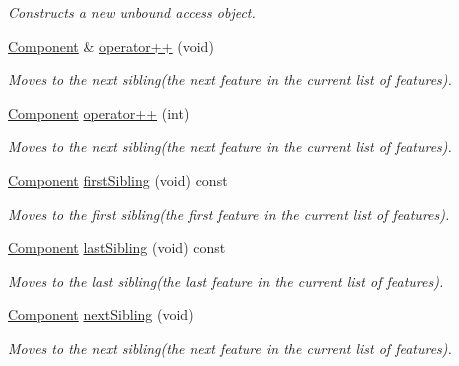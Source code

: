 \begin{DoxyCompactItemize}
\begin{DoxyCompactList}\small\item\em Constructs a new unbound access object. \end{DoxyCompactList}\item 
\hyperlink{classmv_i_m_p_a_c_t_1_1acquire_1_1_component}{Component} \& \hyperlink{classmv_i_m_p_a_c_t_1_1acquire_1_1_component_aa0ce09671eb0bfd13bc9c41a62a4c2a0}{operator++} (void)
\begin{DoxyCompactList}\small\item\em Moves to the next sibling(the next feature in the current list of features). \end{DoxyCompactList}\item 
\hyperlink{classmv_i_m_p_a_c_t_1_1acquire_1_1_component}{Component} \hyperlink{classmv_i_m_p_a_c_t_1_1acquire_1_1_component_a3c0e62e36aa38069b8f9d2fa7a242b1e}{operator++} (int)
\begin{DoxyCompactList}\small\item\em Moves to the next sibling(the next feature in the current list of features). \end{DoxyCompactList}\item 
\hyperlink{classmv_i_m_p_a_c_t_1_1acquire_1_1_component}{Component} \hyperlink{classmv_i_m_p_a_c_t_1_1acquire_1_1_component_a3ff9ff4adf233c79c621a81c45f6e3ea}{first\+Sibling} (void) const 
\begin{DoxyCompactList}\small\item\em Moves to the first sibling(the first feature in the current list of features). \end{DoxyCompactList}\item 
\hyperlink{classmv_i_m_p_a_c_t_1_1acquire_1_1_component}{Component} \hyperlink{classmv_i_m_p_a_c_t_1_1acquire_1_1_component_ae7ecdaafa8fc95c761d4e913c199c53d}{last\+Sibling} (void) const 
\begin{DoxyCompactList}\small\item\em Moves to the last sibling(the last feature in the current list of features). \end{DoxyCompactList}\item 
\hyperlink{classmv_i_m_p_a_c_t_1_1acquire_1_1_component}{Component} \hyperlink{classmv_i_m_p_a_c_t_1_1acquire_1_1_component_aeccbdbf047d18e8ac0d20fc874c185a7}{next\+Sibling} (void)
\begin{DoxyCompactList}\small\item\em Moves to the next sibling(the next feature in the current list of features). \end{DoxyCompactList}\item 

\end{DoxyCompactItemize}
